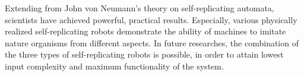 \documentclass[12pt,twoside]{article}
\theoremstyle{plain}
\theoremstyle{definition}
\theoremstyle{remark}
\begin{document}
Extending from John von Neumann's theory on self-replicating automata, scientists have achieved powerful, practical results. Especially, various physically realized self-replicating robots demonstrate the ability of machines to imitate nature organisms from different aspects. In future researches, the combination of the three types of self-replicating robots is possible, in order to attain lowest input complexity and maximum functionality of the system.

%
%



\end{document}
